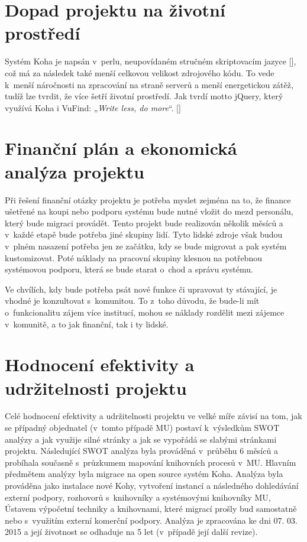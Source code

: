 \documentclass[
	11pt, oneside, printed, final, palatino, monochrome
	microtype,
	table,   %
	lof,     %
	lot     %
]{fithesis3}
\makeatletter
\newcommand{\citepages}[2]{[\cite[#1]{#2}]}
\newcommand{\citesource}[1]{[\cite{#1}]}
\newcommand{\citace}[1]{„\textit{#1}“} %
\makeatother
\begin{document}
{\section{Dopad projektu na životní prostředí}
Systém Koha je napsán v~perlu, neupovídaném stručném skriptovacím jazyce \citepages{v-ix}{Wall1997}, což má za následek také menší celkovou velikost zdrojového kódu. To vede k~menší náročnosti na zpracování na straně serverů a menší energetickou zátěž, tudíž lze tvrdit, že více šetří životní prostředí. Jak tvrdí motto jQuery, který využívá Koha i VuFind: \citace{Write less, do more}. \citesource{jquery_2016}

\section{Finanční plán a ekonomická analýza projektu}
Při řešení finanční otázky projektu je potřeba myslet zejména na to, že finance ušetřené na koupi nebo podporu systému bude nutné vložit do mezd personálu, který bude migraci provádět. Tento projekt bude realizován několik měsíců a v~každé etapě bude potřeba jiné skupiny lidí. Tyto lidské zdroje však budou v~plném nasazení potřeba jen ze začátku, kdy se bude migrovat a pak systém kustomizovat. Poté náklady na pracovní skupiny klesnou na potřebnou systémovou podporu, která se bude starat o~chod a správu systému.

Ve chvílích, kdy bude potřeba psát nové funkce či upravovat ty stávající, je vhodné je konzultovat s~komunitou. To z~toho důvodu, že bude-li mít o~funkcionalitu zájem více institucí, mohou se náklady rozdělit mezi zájemce v~komunitě, a to jak finanční,  tak i ty lidské.

\section{Hodnocení efektivity a udržitelnosti projektu}
Celé hodnocení efektivity a udržitelnosti projektu ve velké míře závisí na tom, jak se případný objednatel (v~tomto případě MU) postaví k~výsledkům SWOT analýzy a jak využije silné stránky a jak se vypořádá se slabými stránkami projektu. Následující SWOT analýza byla prováděná v~průběhu 6 měsíců a probíhala současně s~průzkumem mapování knihovních procesů v~MU. Hlavním předmětem analýzy byla migrace na open source systém Koha. Analýza byla prováděna jako instalace nové Kohy, vytvoření instancí a následného dohledávání externí podpory, rozhovorů s~knihovníky a systémovými knihovníky MU, Ústavem výpočetní techniky a knihovnami, které migrací prošly bud samostatně nebo s~využitím externí komerční podpory. Analýza je zpracována ke dni 07. 03. 2015 a její životnost se odhaduje na 5 let (v~případě její další revize).

}
\end{document}
